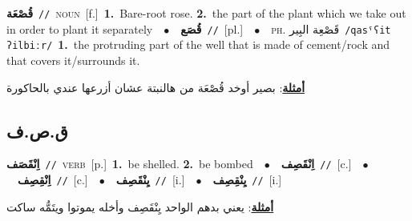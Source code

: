 \documentclass[10pt,a4paper,twoside]{article} %
\begin{document}
\begin{multicols}{2}
{\setlength\topsep{0pt}\textbf{\foreignlanguage{arabic}{قُصْعَة}}\ {\color{gray}\texttt{//}\color{black}}\ \textsc{noun}\ [f.]\ \textbf{1.}~Bare-root rose.  \textbf{2.}~the part of the plant which we take out in order to plant it separately\ \ $\bullet$\ \ \setlength\topsep{0pt}\textbf{\foreignlanguage{arabic}{قُصَع}}\ {\color{gray}\texttt{//}\color{black}}\ [pl.]\ \ $\bullet$\ \ \textsc{ph.} \color{gray} \foreignlanguage{arabic}{قَصْعِة البِير}\color{black}\ {\color{gray}\texttt{/{\sffamily qasˤʕit ʔilbiːr}/}\color{black}}\ \textbf{1.}~the protruding part of the well that is made of cement/rock and that covers it/surrounds it.\  \begin{flushright}\color{gray}\foreignlanguage{arabic}{\textbf{\underline{\foreignlanguage{arabic}{أمثلة}}}: بصير أوخد قُصْعَة من هالنبتة عشان أزرعها عندي بالحاكورة}\end{flushright}\color{black}} \vspace{2mm}

\vspace{-3mm}
\subsection*{\color{blue}\foreignlanguage{arabic}{ق.ص.ف}\color{blue}{}} 

{\setlength\topsep{0pt}\textbf{\foreignlanguage{arabic}{اِنْقَصَف}}\ {\color{gray}\texttt{//}\color{black}}\ \textsc{verb}\ [p.]\ \textbf{1.}~be shelled.  \textbf{2.}~be bombed\ \ $\bullet$\ \ \setlength\topsep{0pt}\textbf{\foreignlanguage{arabic}{اِنْقَصِف}}\ {\color{gray}\texttt{//}\color{black}}\ [c.]\ \ $\bullet$\ \ \setlength\topsep{0pt}\textbf{\foreignlanguage{arabic}{اِنْقِصِف}}\ {\color{gray}\texttt{//}\color{black}}\ [c.]\ \ $\bullet$\ \ \setlength\topsep{0pt}\textbf{\foreignlanguage{arabic}{يِنْقَصِف}}\ {\color{gray}\texttt{//}\color{black}}\ [i.]\ \ $\bullet$\ \ \setlength\topsep{0pt}\textbf{\foreignlanguage{arabic}{يِنْقِصِف}}\ {\color{gray}\texttt{//}\color{black}}\ [i.]\  \begin{flushright}\color{gray}\foreignlanguage{arabic}{\textbf{\underline{\foreignlanguage{arabic}{أمثلة}}}: يعني بدهم الواحد يِنْقَصِف وأخله يموتوا ويتَمُّه ساكت}\end{flushright}\color{black}} \vspace{2mm}


\end{multicols}
\end{document}
